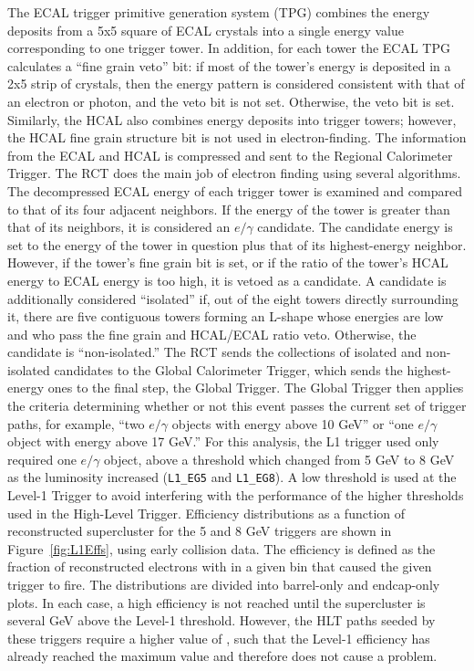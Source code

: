 The ECAL trigger primitive generation system (TPG) combines the energy deposits 
from a 5x5 square of ECAL crystals into a single energy value corresponding to 
one trigger tower. %
In addition, for each tower the ECAL TPG calculates a ``fine grain veto'' bit: 
if most of the tower's energy is deposited in a 2x5 strip of crystals, 
then the energy pattern is considered consistent with that of an electron
or photon, 
and the veto bit is not set.  
Otherwise, the veto bit is set.  
Similarly, the HCAL also combines energy deposits into trigger towers; 
however, the HCAL fine grain structure bit is not used in electron-finding.  
The information from the ECAL and HCAL is compressed and sent to the 
Regional Calorimeter Trigger.  
The RCT does the main job of electron finding using several algorithms.  
The decompressed ECAL energy of each trigger tower is examined and 
compared to that of its four adjacent neighbors.  
If the energy of the tower is greater than that of its neighbors, 
it is considered an $e/\gamma$ candidate.  
The candidate energy is set to the energy of the tower in question 
plus that of its highest-energy neighbor.  
However, if the tower's fine grain bit is set, 
or if the ratio of the tower's HCAL energy to ECAL energy is too high, 
it is vetoed as a candidate.  
A candidate is additionally considered ``isolated'' if, 
out of the eight towers directly surrounding it, 
there are five contiguous towers forming an L-shape whose 
energies are low and who pass the fine grain and HCAL/ECAL ratio veto.  
Otherwise, the candidate is ``non-isolated.''  
The RCT sends the collections of isolated and non-isolated candidates to the 
Global Calorimeter Trigger, 
which sends the highest-energy ones to the final step, the Global Trigger.  
The Global Trigger then applies the criteria determining whether or not 
this event passes the current set of trigger paths,
for example, ``two $e/\gamma$ objects with energy above 10 GeV'' 
or ``one $e/\gamma$ object with energy above 17 GeV.''  
For this analysis, the L1 trigger used only required one $e/\gamma$ 
object, above a threshold which changed from 5 GeV to 8 GeV 
as the luminosity increased (\texttt{L1\_EG5} and \texttt{L1\_EG8}).  
A low threshold is used at the Level-1 Trigger 
to avoid interfering with the performance 
of the higher thresholds used in the High-Level Trigger.  
Efficiency distributions as a function of 
reconstructed supercluster \Et for the 5 and 8 GeV triggers 
are shown in Figure~\ref{fig:L1Effs}, 
using early collision data.  
The efficiency is defined as the fraction of reconstructed electrons 
with \Et in a given bin that caused the given trigger to fire.  
The distributions are divided into barrel-only and endcap-only plots.  
In each case, a high efficiency is not reached until 
the supercluster \Et is several GeV above the Level-1 threshold.  
However, the HLT paths seeded by these triggers require 
a higher value of \Et, 
such that the Level-1 efficiency has already reached the maximum value 
and therefore does not cause a problem.  

